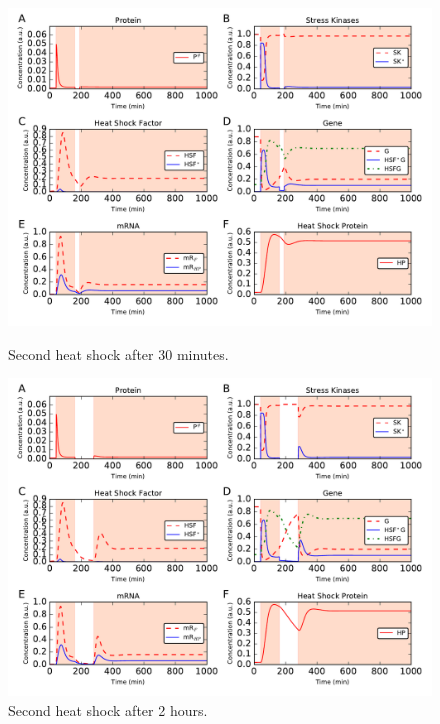 \documentclass[oneside, 10pt, a4paper, twocolumn]{article}
\begin{document}
\begin{figure}
  \includegraphics[width=\textwidth, height=0.35\textheight]{HeatShockResponse_SimulationDoubleHeat30min.pdf}
  \caption*{\small{Second heat shock after 30 minutes.}}
\endminipage\hfill
{}
  \includegraphics[width=\textwidth, height=0.35\textheight]{HeatShockResponse_SimulationDoubleHeat2h.pdf}
  \caption*{\small{Second heat shock after 2 hours.}}
\endminipage\hfill
{}

\end{figure}
\end{document}
